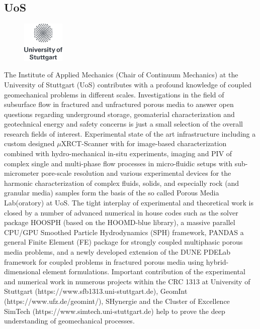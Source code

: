 \subsection{UoS}
\begin{figure}
\centering
\includegraphics[width=2cm]{figures/unistuttgart_logo.png}
\end{figure}
The Institute of Applied Mechanics (Chair of Continuum Mechanics) at the University of Stuttgart (UoS) contributes with a profound knowledge of coupled geomechanical problems in different scales. Investigations in the field of subsurface flow in fractured and unfractured porous media to answer open questions regarding underground storage, geomaterial characterization and geotechnical energy and safety concerns is just a small selection of the overall research fields of interest. Experimental state of the art infrastructure including a custom designed $\mu$XRCT-Scanner with for image-based characterization combined with hydro-mechanical in-situ experiments, imaging and PIV of complex single and multi-phase flow processes in micro-fluidic setups with sub-micrometer pore-scale resolution and various experimental devices for the harmonic characterization of complex fluids, solids, and especially rock (and granular media) samples form the basis of the so called Porous Media Lab(oratory) at UoS. The tight interplay of experimental and theoretical work is closed by a number of advanced numerical in house codes such as the solver package HOOSPH (based on the HOOMD-blue library), a massive parallel CPU/GPU Smoothed Particle Hydrodynamics (SPH) framework, PANDAS a general Finite Element (FE) package for strongly coupled multiphasic porous media problems, and a newly developed extension of the DUNE PDELab framework for coupled problems in fractured porous media using hybrid-dimensional element formulations. Important contribution of the experimental and numerical work in numerous projects within the CRC 1313 at University of Stuttgart (https://www.sfb1313.uni-stuttgart.de), GeomInt (https://www.ufz.de/geomint/), SHynergie and the Cluster of Excellence SimTech (https://www.simtech.uni-stuttgart.de) help to prove the deep understanding of geomechanical processes.